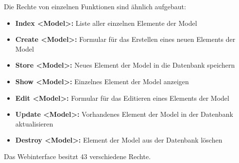 Die Rechte von einzelnen Funktionen sind ähnlich aufgebaut:

\begin{itemize}
  \item \textbf{Index <Model>:} Liste aller einzelnen Elemente der Model
  \item \textbf{Create <Model>:} Formular für das Erstellen eines neuen
  Elements der Model
  \item \textbf{Store <Model>:} Neues Element der Model in die Datenbank speichern
  \item \textbf{Show <Model>:} Einzelnes Element der Model anzeigen
  \item \textbf{Edit <Model>:} Formular für das Editieren eines Elements der
  Model
  \item \textbf{Update <Model>:} Vorhandenes Element der Model in der
  Datenbank aktualisieren
  \item \textbf{Destroy <Model>:} Element der Model aus der Datenbank löschen
\end{itemize}

Das Webinterface besitzt 43 verschiedene Rechte.

